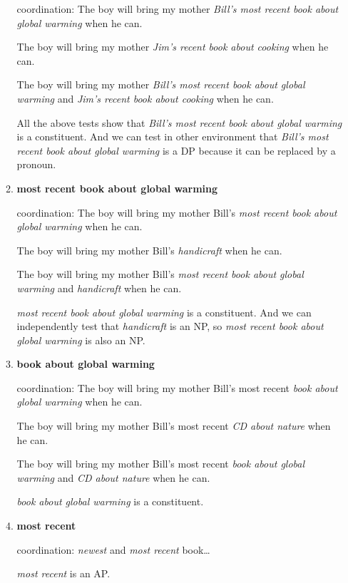 \documentclass[a4paper,12pt]{article}
\begin{document}
\begin{enumerate}
\begin{enumerate}
      coordination: The boy will bring my mother \textit{Bill's most recent book about global warming} when he can.

      The boy will bring my mother \textit{Jim's recent book about cooking} when  he can.

      The boy will bring my mother \textit{Bill's most recent book about global warming} and \textit{Jim's recent book about cooking} when he can.

      All the above tests show that \textit{Bill's most recent book about global warming} is a constituent. And we can test in other environment that
      \textit{Bill's most recent book about global warming} is a DP because it can be replaced by a pronoun.

      \item \textbf{most recent book about global warming}

      coordination: The boy will bring my mother Bill's \textit{most recent book about global warming} when he can.

      The boy will bring my mother Bill's \textit{handicraft}  when he can.

      The boy will bring my mother Bill's \textit{most recent book about global warming} and \textit{handicraft} when he can.

      \textit{most recent book about global warming} is a constituent. And we can independently test that \textit{handicraft} is an NP, so \textit{most recent book about global warming} is also an NP.

      \item 	\textbf{book about global warming}

         coordination: The boy will bring my mother Bill's most recent \textit{book about global warming}  when he can.

         The boy will bring my mother Bill's most recent \textit{CD about nature}  when he can.

         The boy will bring my mother Bill's most recent \textit{book about global warming} and \textit{CD about nature} when he can.

         \textit{book about global warming} is a constituent.

      \item \textbf{most recent}
      
         coordination: \textit{newest} and \textit{most recent} book\dots
         
         \textit{most recent} is an AP.


\end{enumerate}
\end{enumerate}
\end{document}

